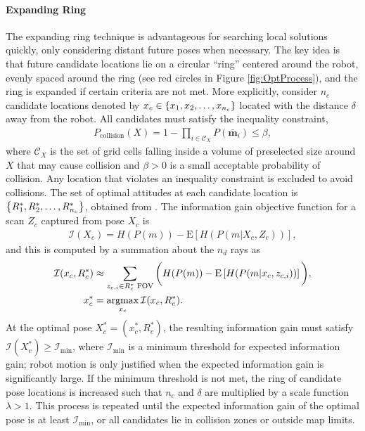 \paragraph{Expanding Ring}
The expanding ring technique is advantageous for searching local solutions quickly, only considering distant future poses when necessary. The key idea is that future candidate locations lie on a circular ``ring'' centered around the robot, evenly spaced around the ring (see red circles in Figure \ref{fig:OptProcess}), and the ring is expanded if certain criteria are not met. More explicitly, consider $n_c$ candidate locations denoted by $x_c\in\left\{ x_1,x_2,\ldots,x_{n_c} \right\}$ located with the distance $\delta$ away from the robot. All candidates must satisfy the inequality constraint,
\begin{align}
\label{eqn:CollisionInequalityConstraint}
P_\text{collision}(X)=1-\prod_{i\in\mathcal C_X}P(\bar{\mathbf{m}}_i)\leq\beta,
\end{align}
where $\mathcal C_X$ is the set of grid cells falling inside a volume of preselected size around $X$ that may cause collision and $\beta>0$ is a small acceptable probability of collision. Any location that violates an inequality constraint  is excluded to avoid collisions. The set of optimal attitudes at each candidate location is $\left\{ R^*_{1},R^*_{2},\ldots,R^*_{n_c} \right\}$, obtained from . The information gain objective function for a scan $Z_c$ captured from pose $X_c$ is
\begin{align}
\label{eqn:ObjFun}
\mathcal I(X_c)=H(P(m))-\text{E}\left[H(P(m|X_c,Z_c))\right],
\end{align}
and this is computed by a summation about the $n_d$ rays as %
\begin{align}
\label{eqn:ObjFunApprox}
\mathcal I(x_c,R_c^*)&\approx \sum_{z_{c,i}\in R_{c}^*\text{ FOV}}\bigg(H(P(m))-\text{E}\left[H(P(m|x_c,z_{c,i}))\right]\bigg),
\\
x_c^*&=\argmax_{x_c}\mathcal I(x_c,R_c^*).
\end{align}
At the optimal pose $X^*_c=(x^*_c,R^*_c)$, the resulting information gain must satisfy $\mathcal I(X_c^*)\geq\mathcal I_\text{min}$, where $\mathcal I_\text{min}$ is a minimum threshold for expected information gain; robot motion is only justified when the expected information gain is significantly large. If the minimum threshold is not met, the ring of candidate pose locations is increased such that $n_c$ and $\delta$ are multiplied by a scale function $\lambda>1$.
This process is repeated until the expected information gain of the optimal pose is at least $\mathcal I_\text{min}$, or all candidates lie in collision zones or outside map limits. %

